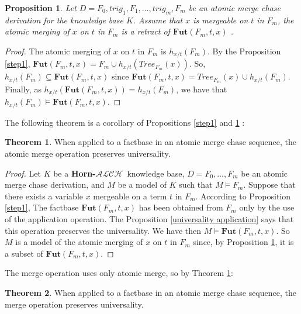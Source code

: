 \documentclass{article}
\newtheorem{proposition}{Proposition}[section]
\theoremstyle{definition}
\newtheorem{theorem}{Theorem}[section]
\theoremstyle{remark}
\newcommand{\Tree}{\textit{Tree}}
\newcommand{\Fut}{\textbf{Fut}}
\newcommand{\ALCH}{\textbf{Horn-$\mathcal{ALCH}$}}
\begin{document}
\begin{proposition} \label{step2}
Let $D = F_0,trig_1,F_1,\ldots, trig_m,F_m$ be an atomic merge chase derivation for the knowledge base $K$. Assume that $x$ is mergeable on $t$ in $F_m$, the atomic merging of $x$ on $t$ in $F_m$ is a retract of $\Fut(F_m,t,x)$ .
\end{proposition}

\begin{proof}
The atomic merging of $x$ on $t$ in $F_m$ is $h_{x/t}(F_m)$. By the Proposition \ref{step1}, $\Fut(F_m,t,x)= F_m \cup h_{x/t}(\Tree_{F_m}(x))$. So, $h_{x/t}(F_m) \subseteq \Fut(F_m,t,x) $ since $\Fut(F_m,t,x) = \Tree_{F_m}(x) \cup h_{x/t}(F_m)$. Finally, as $h_{x/t}(\Fut(F_m,t,x)) = h_{x/t}(F_m)$, we have that $h_{x/t}(F_m) \models \Fut(F_m,t,x)$.
\end{proof}

The following theorem is a corollary of Propositions \ref{step1} and \ref{step2} :

\begin{theorem} \label{universality atomic merge}
When applied to a factbase in an atomic merge chase sequence, the atomic merge operation preserves universality.
\end{theorem}

\begin{proof}
Let $K$ be a \ALCH\ knowledge base, $D=F_0,\ldots, F_m$ be an atomic merge chase derivation, and $M$ be a model of $K$ such that $M \models F_m$. Suppose that there exists a variable $x$ mergeable on a term $t$ in $F_m$. According to Proposition \ref{step1}, The factbase $\Fut(F_m,t,x)$ has been obtained from $F_m$ only by the use of the application operation. The Proposition \ref{universality application} says that this operation preserves the universality. We have then $M \models \Fut(F_m,t,x)$. So $M$ is a model of the atomic merging of $x$ on $t$ in $F_m$ since, by Proposition \ref{step2}, it is a subset of $\Fut(F_m,t,x)$.
\end{proof}





The merge operation uses only atomic merge, so by Theorem \ref{universality atomic merge}:

\begin{theorem} \label{universality merge}
When applied to a factbase in an atomic merge chase sequence, the merge operation preserves universality.
\end{theorem}
\end{document}

